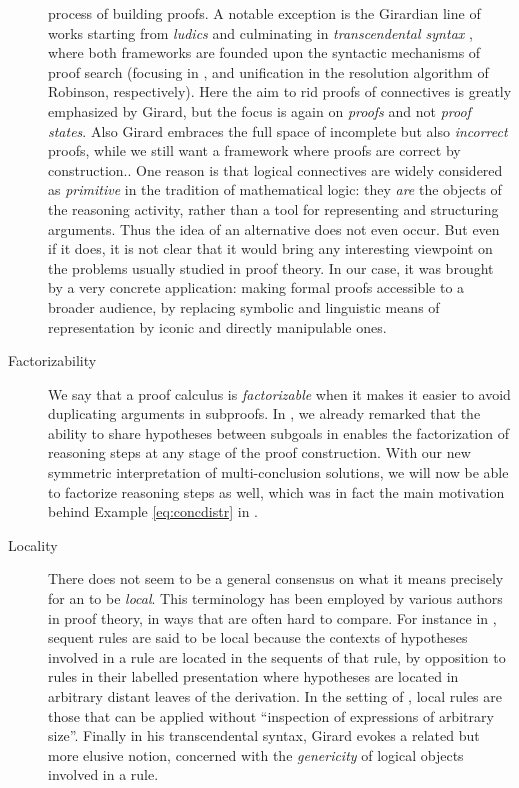 \begin{description}
{    process of building proofs. A notable exception is the Girardian line of
    works starting from \emph{ludics} \cite{girard_locus_2001} and culminating
    in \emph{transcendental syntax} \cite{eng_exegesis_2023}, where both
    frameworks are founded upon the syntactic mechanisms of proof search
    (focusing in , and unification in the resolution algorithm
    of Robinson, respectively). Here the aim to rid proofs of connectives is
    greatly emphasized by Girard, but the focus is again on \emph{proofs} and
    not \emph{proof states}. Also Girard embraces the full space of incomplete
    but also \emph{incorrect} proofs, while we still want a framework where
    proofs are correct by construction.}. One reason is that logical connectives
    are widely considered as \emph{primitive} in the tradition of mathematical
    logic: they \emph{are} the objects of the reasoning activity, rather than a
    tool for representing and structuring arguments. Thus the idea of an
    alternative does not even occur. But even if it does, it is not clear that
    it would bring any interesting viewpoint on the problems usually studied in
    proof theory. In our case, it was brought by a very concrete application:
    making formal proofs accessible to a broader audience, by replacing symbolic
    and linguistic means of representation by iconic and directly manipulable
    ones.
  \item[Factorizability]
    We say that a proof calculus is \emph{factorizable} when it makes it easier
    to avoid duplicating arguments in subproofs. In , we
    already remarked that the ability to share hypotheses between subgoals in
     enables the factorization of \emph{} reasoning steps at any
    stage of the proof construction. With our new symmetric interpretation of
    multi-conclusion solutions, we will now be able to factorize \emph{}
    reasoning steps as well, which was in fact the main motivation behind
    Example \ref{eq:concdistr} in .
  \item[Locality]
    There does not seem to be a general consensus on what it means precisely for
    an  to be \emph{local}. This terminology has been employed by
    various authors in proof theory, in ways that are often hard to compare. For
    instance in , sequent rules are said to be
    local because the contexts of hypotheses involved in a rule are located in
    the sequents of that rule, by opposition to  rules in their
    labelled presentation where hypotheses are located in arbitrary distant
    leaves of the derivation. In the setting of , local rules are
    those that can be applied without ``inspection of expressions of arbitrary
    size''. Finally in his transcendental
    syntax, Girard evokes a related but more elusive notion, concerned with the
    \emph{genericity} of logical objects involved in a rule.
    

\end{description}

